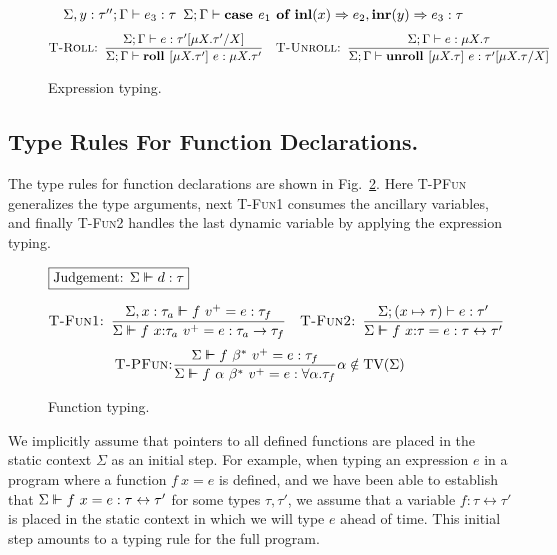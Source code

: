 \begin{figure}[t!]
\begin{align*}
{\begin{array}{ccccc}
       \Sigma, y : \tau''; \Gamma \vdash e_3 : \tau
       \end{array}}
      {\Sigma;\Gamma\vdash\textbf{case } e_1 \textbf{ of } \textbf{inl}(x) \Rightarrow e_2, \textbf{inr}(y) \Rightarrow e_3 : \tau}
\end{align*}
\alignspace
\begin{align*}
  \textsc{T-Roll: }
    \dfrac
      {\Sigma;\Gamma\vdash e : \tau' [\mu X . \tau' / X]}
      {\Sigma;\Gamma\vdash \textbf{roll } [\mu X . \tau']\ e : \mu X . \tau'} &&
  \textsc{T-Unroll: }
    \dfrac
      {\Sigma;\Gamma\vdash e : \mu X . \tau}
      {\Sigma;\Gamma\vdash \textbf{unroll } [\mu X . \tau]\ e : \tau' [\mu X . \tau / X]}
\end{align*}
\caption{Expression typing.}\label{fig:exprType}
\end{figure}

\subsection{Type Rules For Function Declarations.}

The type rules for function declarations are shown in Fig.~\ref{fig:funcType}.
Here \textsc{T-PFun} generalizes the type arguments, next \textsc{T-Fun1}
consumes the ancillary variables, and finally \textsc{T-Fun2} handles the last
dynamic variable by applying the expression typing.

\begin{figure}[t]
\setlength\fboxsep{0.15cm}
\noindent$\boxed{\text{Judgement: } \Sigma \vdash\!\!\!\vdash d : \tau}$

\begin{align*}
  \textsc{T-Fun1: }
    \dfrac
      {\Sigma, x : \tau_a \vdashd f~v^+ = e : \tau_f}
      {\Sigma \vdashd f~x{:}\tau_a\ v^+ = e : \tau_a \rightarrow \tau_f} &&
  \textsc{T-Fun2: }
    \dfrac
      {\Sigma; (x \mapsto \tau) \vdashe e : \tau'}
      {\Sigma \vdashd f~x{:}\tau = e : \tau \leftrightarrow \tau'}
\end{align*}
\alignspace
\begin{align*}
  \textsc{T-PFun:}
    \dfrac
      {\Sigma \vdash\!\!\!\vdash f~\beta^*~v^+ = e : \tau_f}
      {\Sigma \vdash\!\!\!\vdash f~\alpha~\beta^*~v^+ = e : \forall \alpha.\tau_f} \alpha
      \notin \text{TV}(\Sigma)
\end{align*}

\caption{Function typing.}\label{fig:funcType}
\end{figure}

We implicitly assume that pointers to all defined functions are placed in the
static context $\Sigma$ as an initial step. For example, when typing an
expression $e$ in a program where a function $f~x = e$ is defined, and we have
been able to establish that $\Sigma \vdash\!\!\!\vdash f~x = e : \tau \leftrightarrow
\tau'$ for some types $\tau, \tau'$, we assume that a variable $f : \tau
\leftrightarrow \tau'$ is placed in the static context in which we will type
$e$ ahead of time. This initial step amounts to a typing rule for the full
program.

